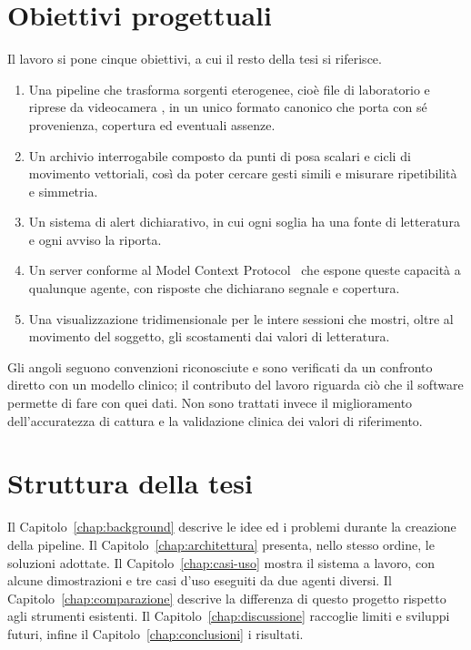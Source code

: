 \section{Obiettivi progettuali}
\label{sec:ch1:obiettivi}

Il lavoro si pone cinque obiettivi, a cui il resto della tesi si riferisce.

\begin{enumerate}[label=\textbf{O\arabic*.},leftmargin=*]
  \item Una pipeline che trasforma sorgenti eterogenee, cioè file di laboratorio
    e riprese da videocamera , in un unico formato 
    canonico che porta con sé provenienza, copertura ed eventuali assenze.
  \item Un archivio interrogabile composto da punti di posa scalari e cicli di movimento vettoriali, così da poter cercare gesti simili e misurare
    ripetibilità e simmetria.
  \item Un sistema di alert dichiarativo, in cui ogni soglia ha una fonte di
    letteratura e ogni avviso la riporta.
  \item Un server conforme al Model Context Protocol~\cite{mcpspec} che espone queste capacità a
    qualunque agente, con risposte che dichiarano segnale e copertura.
  \item Una visualizzazione tridimensionale per le intere sessioni che mostri, oltre al movimento del soggetto, gli scostamenti dai valori di letteratura.
\end{enumerate}

Gli angoli seguono convenzioni riconosciute e sono verificati da un confronto diretto con un modello clinico; 
il contributo del lavoro riguarda ciò che il software permette di fare
con quei dati. Non sono trattati invece il miglioramento dell'accuratezza di cattura e la validazione clinica dei valori di riferimento.

\section{Struttura della tesi}
\label{sec:ch1:struttura}

Il Capitolo~\ref{chap:background} descrive le idee ed i problemi durante la creazione della pipeline.
Il Capitolo~\ref{chap:architettura} presenta, nello stesso ordine, le soluzioni
adottate. Il Capitolo~\ref{chap:casi-uso} mostra il sistema a lavoro, con alcune
dimostrazioni e tre casi d'uso eseguiti da due agenti diversi. Il
Capitolo~\ref{chap:comparazione} descrive la differenza di questo progetto rispetto agli
strumenti esistenti. Il Capitolo~\ref{chap:discussione} raccoglie limiti e
sviluppi futuri, infine il Capitolo~\ref{chap:conclusioni} i risultati.
